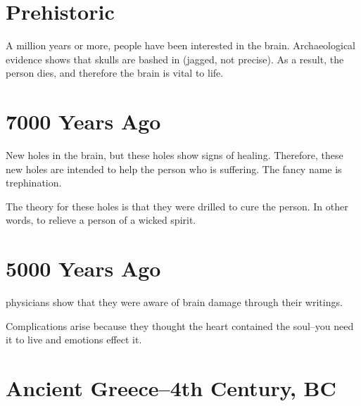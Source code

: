 \section{Prehistoric}

\begin{coloredlist}
    \item A million years or more, people have been interested in the brain. Archaeological evidence shows that skulls are bashed in (jagged, not precise). As a result, the person dies, and therefore the brain is vital to life.
\end{coloredlist}

\section{7000 Years Ago}

\begin{coloredlist}
    \item New holes in the brain, but these holes show signs of healing. Therefore, these new holes are intended to help the person who is suffering.
    The fancy name is trephination.
    \item The theory for these holes is that they were drilled to cure the person. In other words, to relieve a person of a wicked spirit.
\end{coloredlist}

\section{5000 Years Ago}

\begin{coloredlist}
    \item {} physicians show that they were aware of brain damage through their writings.
    \item Complications arise because they thought the heart contained the soul--you need it to live and emotions effect it.
\end{coloredlist}

\section{Ancient Greece--4th Century, BC}

\label{person:hippocrates}%
\subsection{}

